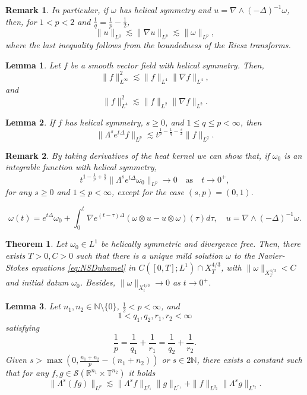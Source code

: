 \documentclass[10pt,a4paper]{amsart}
\newtheorem{rem}{Remark}
\newtheorem{lemma}{Lemma}
\newtheorem{thm}{Theorem}
\newcommand{\N}{\mathbb{N}}
\newcommand{\R}{\mathbb{R}}
\newcommand{\T}{\mathbb{T}}
\def\heat#1{e^{#1 \Delta}}
\newcommand{\na}{\nabla}
\newcommand{\w}{\omega}
\begin{document}
\begin{rem}\label{uregularity} In particular, if $\omega$ has helical symmetry and $u=\nabla\wedge(-\Delta)^{-1}\omega$,
then, for $1<p<2$ and $\frac1q=\frac1p-\frac12$,
\[
\|u\|_{L^q}
 \lesssim \|\nabla u\|_{L^p}
 \lesssim \|\omega\|_{L^p},
\]
where the last inequality follows from the boundedness of the Riesz
transforms.
\end{rem}

\begin{lemma}\label{lem:gagliardoniremberg}
Let $f$ be a smooth vector field with helical symmetry. Then,
$$\|f\|^2_{L^\infty}\lesssim \|f\|_{L^4}\|\na f\|_{L^4},$$
and
$$\|f\|^2_{L^4}\lesssim \|f\|_{L^2}\|\na f\|_{L^2}.$$
\end{lemma}

\begin{lemma}\label{lemma:heathelicalestimates}
If $f$ has helical symmetry, $s\geq 0$, and $1\leq q\leq p< \infty$, then 
$$\|\Lambda^s e^{t\Delta}f\|_{L^p}\lesssim t^{\frac{1}{p}-\frac{1}{q}-\frac{s}{2}}\|f\|_{L^q}.$$
\end{lemma}

\begin{rem}\label{rem:heatsmallXphigherorder} By taking derivatives of the heat kernel we can show that, if $\w_0$ is an integrable function with helical symmetry,
\begin{equation}\label{eq:heatscaling}
t^{1-\frac{1}{p}+\frac{s}{2}}\|\Lambda^s\heat{t}\w_0\|_{L^p}\to 0 \quad \text{as}\quad t\to 0^+,   
\end{equation}
for any $s\geq 0$ and $1\leq p<\infty$, except for the case $(s,p)=(0,1).$
\end{rem}

\begin{equation}\label{eq:NSDuhamel}
\w(t)=\heat{t}\w_0+\int_0^t\na\heat{(t-\tau)}(\w\otimes u-u\otimes \w)(\tau)d\tau, \quad u=\na\wedge(-\Delta)^{-1}\w.
\end{equation}

\begin{thm}\label{thm:shorttimeWP}
Let $\w_0\in L^1$ be helically symmetric and divergence free. Then, there exists $T>0, C>0$ such that there is a unique mild solution $\omega$ to the Navier-Stokes equations \eqref{eq:NSDuhamel} in $C([0,T];L^1)\cap X^{4/3}_T $, with $\|\w\|_{X^{4/3}_T}<C$ and initial datum $\w_0$. Besides, $\|\w\|_{X^{4/3}_t}\to 0$ as $t\to 0^+$.
\end{thm}

\begin{lemma}\label{lem:KatoPonce}
Let $n_1,n_2\in \N\setminus{\{0\}}$, $\frac{1}{2}<p<\infty$, and
$$
1<q_1,q_2,r_1,r_2<\infty
$$
satisfying
$$
\frac{1}{p}
=
\frac{1}{q_1}+\frac{1}{r_1}
=
\frac{1}{q_2}+\frac{1}{r_2}.
$$
Given $s>\max(0, \frac{n_1+n_2}{p}-(n_1+n_2))$ or $s\in 2\mathbb{N}$, there exists a constant such that
for any $f,g\in \mathscr{S}(\R^{n_1}\times\T^{n_2})$ it holds
$$
\|\Lambda^s(fg)\|_{L^p}
\lesssim
\|\Lambda^s f\|_{L^{q_1}}\|g\|_{L^{r_1}}
+
\|f\|_{L^{q_2}}\|\Lambda^s g\|_{L^{r_2}}.
$$
\end{lemma}
\end{document}
